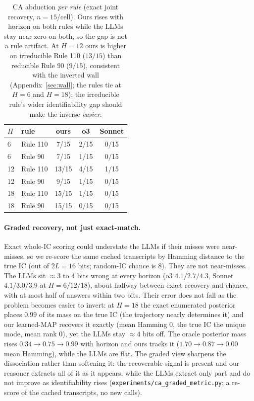 \documentclass{article}
\begin{document}
\begin{table}[t]
\centering
\caption{CA abduction \emph{per rule} (exact joint recovery, $n=15$/cell). Ours rises with horizon on
both rules while the LLMs stay near zero on both, so the gap is not a rule artifact. At $H=12$ ours is
higher on irreducible Rule 110 ($13/15$) than reducible Rule 90 ($9/15$), consistent with the inverted
wall (Appendix~\ref{sec:wall}; the rules tie at $H{=}6$ and $H{=}18$): the irreducible rule's wider
identifiability gap should make the inverse \emph{easier}.}
\label{tab:perrule}
\begin{tabular}{@{}llccc@{}}
\toprule
$H$ & rule & ours & o3 & Sonnet \\
\midrule
6  & Rule 110 & 7/15  & 2/15 & 0/15 \\
6  & Rule 90  & 7/15  & 1/15 & 0/15 \\
12 & Rule 110 & 13/15 & 4/15 & 1/15 \\
12 & Rule 90  & 9/15  & 1/15 & 0/15 \\
18 & Rule 110 & 15/15 & 1/15 & 0/15 \\
18 & Rule 90  & 15/15 & 0/15 & 0/15 \\
\bottomrule
\end{tabular}
\end{table}



\paragraph{Graded recovery, not just exact-match.}
Exact whole-IC scoring could understate the LLMs if their misses were near-misses, so we re-score the
same cached transcripts by Hamming distance to the true IC (out of $2L{=}16$ bits; random-IC chance is
$8$). They are not near-misses. The LLMs sit $\approx 3$ to $4$ bits wrong at every horizon (o3
$4.1/2.7/4.3$, Sonnet $4.1/3.0/3.9$ at $H{=}6/12/18$), about halfway between exact recovery and chance,
with at most half of answers within two bits. Their error does not fall as the problem becomes easier
to invert: at $H{=}18$ the exact enumerated posterior places $0.99$ of its mass on the true IC (the
trajectory nearly determines it) and our learned-MAP recovers it exactly (mean Hamming $0$, the true IC
the unique mode, mean rank $0$), yet the LLMs stay $\approx 4$ bits off. The oracle posterior mass rises
$0.34 \rightarrow 0.75 \rightarrow 0.99$ with horizon and ours tracks it ($1.70 \rightarrow 0.87
\rightarrow 0.00$ mean Hamming), while the LLMs are flat. The graded view sharpens the dissociation
rather than softening it: the recoverable signal is present and our reasoner extracts all of it as it
appears, while the LLMs extract only part and do not improve as identifiability rises
(\texttt{experiments/ca\_graded\_metric.py}; a re-score of the cached transcripts, no new calls).
\end{document}
